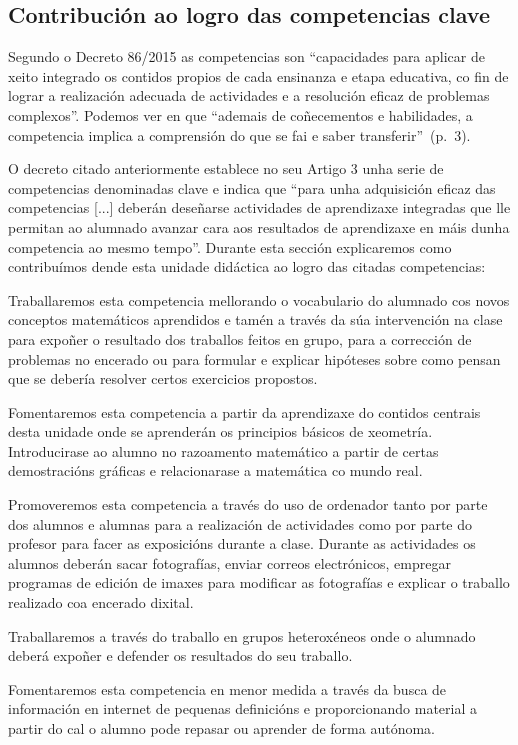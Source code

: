 \subsection{Contribución ao logro das competencias clave}\label{sec:competencias}
Segundo o Decreto 86/2015 as competencias son ``capacidades para aplicar de xeito integrado os contidos propios de cada ensinanza e etapa educativa, co fin de lograr a realización adecuada de actividades e a resolución eficaz de problemas complexos''. Podemos ver en  que ``ademais de coñecementos e habilidades, a competencia implica a comprensión do que se fai e saber transferir''~(p.~3).

O decreto citado anteriormente establece no seu Artigo 3 unha serie de competencias denominadas clave e indica que ``para unha adquisición eficaz das competencias [...] deberán deseñarse actividades de aprendizaxe integradas que lle permitan ao alumnado avanzar cara aos resultados de aprendizaxe en máis dunha competencia ao mesmo tempo''. Durante esta sección explicaremos como contribuímos dende esta unidade didáctica ao logro das citadas competencias:

\begin{description}[]
    \item[Comunicación Lingüística (CCL)] Traballaremos esta competencia mellorando o vocabulario do alumnado cos novos conceptos matemáticos aprendidos e tamén a través da súa intervención na clase para expoñer o resultado dos traballos feitos en grupo, para a corrección de problemas no encerado ou para formular e explicar hipóteses sobre como pensan que se debería resolver certos exercicios propostos.
    \item[Comp. matemática e comp. básicas en ciencia e tecnoloxía (CMCCT)] Fomentaremos esta competencia a partir da aprendizaxe do contidos centrais desta unidade onde se aprenderán os principios básicos de xeometría. Introducirase ao alumno no razoamento matemático a partir de certas demostracións gráficas e relacionarase a matemática co mundo real.
    \item[Comp. Dixital (CD)] Promoveremos esta competencia a través do uso de ordenador tanto por parte dos alumnos e alumnas para a realización de actividades como por parte do profesor para facer as exposicións durante a clase. Durante as actividades os alumnos deberán sacar fotografías, enviar correos electrónicos, empregar programas de edición de imaxes para modificar as fotografías e explicar o traballo realizado coa encerado dixital.
    \item[Comp. sociais e cívicas (CSC)] Traballaremos a través do traballo en grupos heteroxéneos onde o alumnado deberá expoñer e defender os resultados do seu traballo.
    \item[Aprender a aprender (CAA)] Fomentaremos esta competencia en menor medida a través da busca de información en internet de pequenas definicións e proporcionando material a partir do cal o alumno pode repasar ou aprender de forma autónoma.
\end{description}

